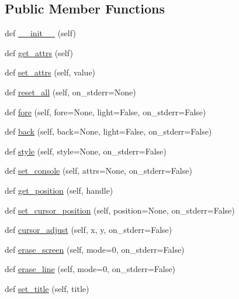 \subsection*{Public Member Functions}
\begin{DoxyCompactItemize}
\item 
def \hyperlink{classpip_1_1__vendor_1_1colorama_1_1winterm_1_1WinTerm_a9b53eb9aebe938bb9eb5546a6134425e}{\+\_\+\+\_\+init\+\_\+\+\_\+} (self)
\item 
def \hyperlink{classpip_1_1__vendor_1_1colorama_1_1winterm_1_1WinTerm_a582393beba4696c10b871c4993421291}{get\+\_\+attrs} (self)
\item 
def \hyperlink{classpip_1_1__vendor_1_1colorama_1_1winterm_1_1WinTerm_a0d56f3f168b237a87874905607474eb9}{set\+\_\+attrs} (self, value)
\item 
def \hyperlink{classpip_1_1__vendor_1_1colorama_1_1winterm_1_1WinTerm_af53ae83a27b56b68e836232f04b3b662}{reset\+\_\+all} (self, on\+\_\+stderr=None)
\item 
def \hyperlink{classpip_1_1__vendor_1_1colorama_1_1winterm_1_1WinTerm_a4c03e028fce56044d6ae2bfe481d386c}{fore} (self, fore=None, light=False, on\+\_\+stderr=False)
\item 
def \hyperlink{classpip_1_1__vendor_1_1colorama_1_1winterm_1_1WinTerm_ae9f6b1631f9ee5728a3cafe4bf53cc9c}{back} (self, back=None, light=False, on\+\_\+stderr=False)
\item 
def \hyperlink{classpip_1_1__vendor_1_1colorama_1_1winterm_1_1WinTerm_ab85bf790ea333b6e852dd673dfed56f5}{style} (self, style=None, on\+\_\+stderr=False)
\item 
def \hyperlink{classpip_1_1__vendor_1_1colorama_1_1winterm_1_1WinTerm_aff86d68f751bbf947258b6c527a6271f}{set\+\_\+console} (self, attrs=None, on\+\_\+stderr=False)
\item 
def \hyperlink{classpip_1_1__vendor_1_1colorama_1_1winterm_1_1WinTerm_a22a228f5f0d6e030941dadee41a82baa}{get\+\_\+position} (self, handle)
\item 
def \hyperlink{classpip_1_1__vendor_1_1colorama_1_1winterm_1_1WinTerm_a0ce164e9407eb4c44598b8b6b1446052}{set\+\_\+cursor\+\_\+position} (self, position=None, on\+\_\+stderr=False)
\item 
def \hyperlink{classpip_1_1__vendor_1_1colorama_1_1winterm_1_1WinTerm_aacc5095d5e2a4bf3f28602dc8f5ac9e9}{cursor\+\_\+adjust} (self, x, y, on\+\_\+stderr=False)
\item 
def \hyperlink{classpip_1_1__vendor_1_1colorama_1_1winterm_1_1WinTerm_ade640507533c1c5000ba912094481c3d}{erase\+\_\+screen} (self, mode=0, on\+\_\+stderr=False)
\item 
def \hyperlink{classpip_1_1__vendor_1_1colorama_1_1winterm_1_1WinTerm_a9aadf370ba9dd91b823f37702319731e}{erase\+\_\+line} (self, mode=0, on\+\_\+stderr=False)
\item 
def \hyperlink{classpip_1_1__vendor_1_1colorama_1_1winterm_1_1WinTerm_ac41b38b25dacee65c2c3a49f1836e126}{set\+\_\+title} (self, title)
\end{DoxyCompactItemize}


